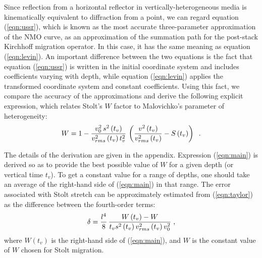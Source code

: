 Since reflection from a horizontal reflector in
vertically-heterogeneous media is kinematically equivalent to
diffraction from a point, we can regard equation (\ref{eqn:ussr}),
which is known as the most accurate three-parameter approximation of
the NMO curve, as an approximation of the summation path for the
post-stack Kirchhoff migration operator. In this case, it has the same
meaning as equation (\ref{eqn:levin}). An important difference between
the two equations is the fact that equation (\ref{eqn:ussr}) is
written in the initial coordinate system and includes coefficients
varying with depth, while equation (\ref{eqn:levin}) applies the
transformed coordinate system and constant coefficients. Using this
fact, we compare the accuracy of the approximations and derive the
following explicit expression, which relates Stolt's $W$ factor to
Malovichko's parameter of heterogeneity:
\begin{equation}
W=1-{{v_0^2\,s^2\left(t_v\right)} \over{v_{rms}^2\left(t_v\right) t_v^2}}\,
\left({{v^2\left(t_v\right)} \over {v_{rms}^2\left(t_v\right)}}
-S\left(t_v\right)
\right)\;\;.
\label{eqn:main} 
\end{equation}

The details of the derivation are given in the appendix. Expression
(\ref{eqn:main}) is derived so as to provide the best possible value
of $W$ for a given depth (or vertical time $t_v$). To get a constant
value for a range of depths, one should take an average of the
right-hand side of (\ref{eqn:main}) in that range.  The error
associated with Stolt stretch can be approximately estimated from
(\ref{eqn:taylor}) as the difference between the fourth-order terms:
\begin{equation}
\delta={{l^4 \over 8}\,{{W\left(t_v\right)-W} \over 
{t_v s^2\left(t_v\right) v_{rms}^2\left(t_v\right) v_0^2}}}\;,
\label{eqn:maxerror} 
\end{equation}
where $W\left(t_v\right)$ is the right-hand side of (\ref{eqn:main}),
and $W$ is the constant value of $W$ chosen for Stolt migration.

